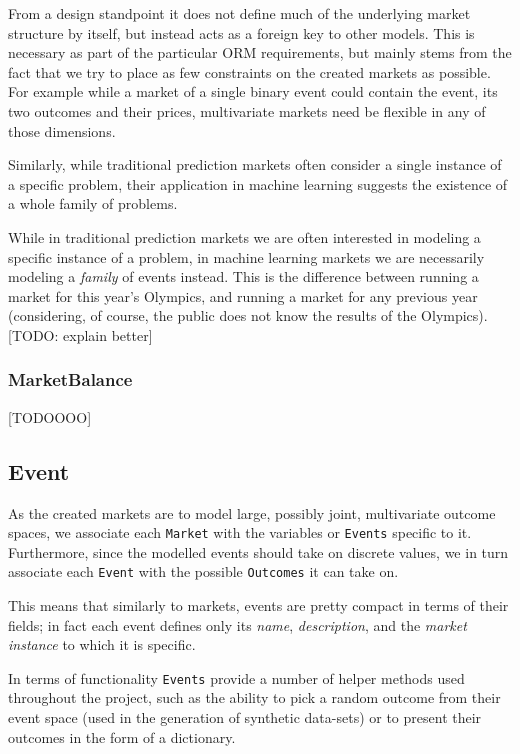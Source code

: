 \documentclass[bsc,frontabs,twoside,singlespacing,parskip,deptreport]{infthesis}     %
\begin{document}
    From a design standpoint it does not define much of the underlying market structure by itself, but instead acts as a foreign key to other models. This is necessary as part of the particular ORM requirements, but mainly stems from the fact that we try to place as few constraints on the created markets as possible. For example while a market of a single binary event could contain the event, its two outcomes and their prices, multivariate markets need be flexible in any of those dimensions. 

    Similarly, while traditional prediction markets often consider a single instance of a specific problem, their application in machine learning suggests the existence of a whole family of problems. 
    
    While in traditional prediction markets we are often interested in modeling a specific instance of a problem, in machine learning markets we are necessarily modeling a {\em family} of events instead. This is the difference between running a market for this year’s Olympics, and running a market for any previous year (considering, of course, the public does not know the results of the Olympics). [TODO: explain better]

\subsubsection{MarketBalance}

	[TODOOOO]
    
\subsection{Event}

	As the created markets are to model large, possibly joint, multivariate outcome spaces, we associate each {\tt Market} with the variables or {\tt Events} specific to it. Furthermore, since the modelled events should take on discrete values, we in turn associate each {\tt Event} with the possible {\tt Outcomes} it can take on. 

	This means that similarly to markets, events are pretty compact in terms of their fields; in fact each event defines only its {\em name}, {\em description}, and the {\em market instance} to which it is specific.

	In terms of functionality {\tt Events} provide a number of helper methods used throughout the project, such as the ability to pick a random outcome from their event space (used in the generation of synthetic data-sets) or to present their outcomes in the form of a dictionary. 
	
\end{document}
